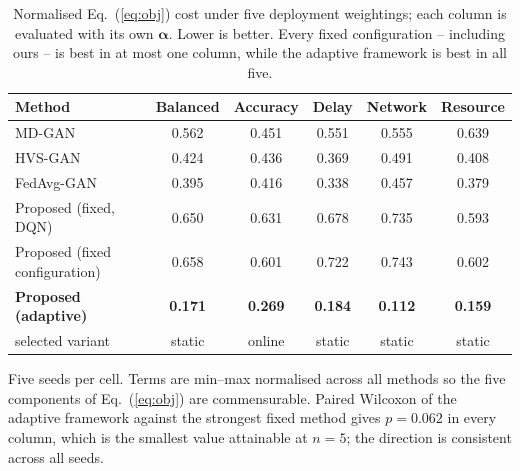 \begin{table}[!t]
\centering
\caption{Normalised Eq.~(\ref{eq:obj}) cost under five deployment weightings;
each column is evaluated with its own $\boldsymbol{\alpha}$. Lower is better.
Every fixed configuration -- including ours -- is best in at most one column,
while the adaptive framework is best in all five.}
\label{tab:scenario}
\begin{tabular}{lccccc}
\toprule
Method & Balanced & Accuracy & Delay & Network & Resource \\
\midrule
MD-GAN~\cite{hardy2019mdgan}   & 0.562 & 0.451 & 0.551 & 0.555 & 0.639 \\
HVS-GAN~\cite{wu2024hvsgan}    & 0.424 & 0.436 & 0.369 & 0.491 & 0.408 \\
FedAvg-GAN                     & 0.395 & 0.416 & 0.338 & 0.457 & 0.379 \\
Proposed (fixed, DQN)          & 0.650 & 0.631 & 0.678 & 0.735 & 0.593 \\
Proposed (fixed configuration) & 0.658 & 0.601 & 0.722 & 0.743 & 0.602 \\
\midrule
\textbf{Proposed (adaptive)}   & \textbf{0.171} & \textbf{0.269} & \textbf{0.184}
                               & \textbf{0.112} & \textbf{0.159} \\
\quad selected variant         & static & online & static & static & static \\
\bottomrule
\end{tabular}
\begin{flushleft}\footnotesize
Five seeds per cell. Terms are min--max normalised across all methods so the
five components of Eq.~(\ref{eq:obj}) are commensurable. Paired Wilcoxon of the
adaptive framework against the strongest fixed method gives $p=0.062$ in every
column, which is the smallest value attainable at $n=5$; the direction is
consistent across all seeds.
\end{flushleft}
\end{table}
